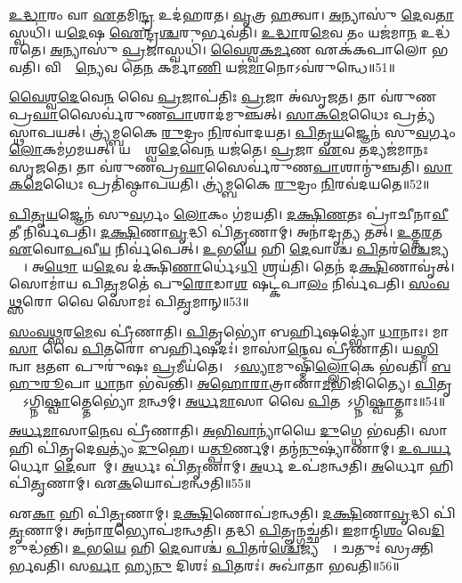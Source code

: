 \ul{𑌉}\ul{𑌦𑍍𑌧𑌾}𑌰𑌂 𑌵𑌾 \ul{𑌏}𑌤𑌮𑌿\ul{𑌨𑍍𑌦𑍍𑌰} 𑌉𑌦॑𑌹𑌰𑌤।
\ul{𑌵𑍃}𑌤𑍍𑌰 \ul{𑌹}𑌤𑍍𑌵𑌾।
\ul{𑌅}𑌨𑍍𑌯𑌾𑌸𑍁॑ \ul{𑌦𑍇}𑌵\ul{𑌤𑌾}𑌸𑍍𑌵𑌧𑌿॑।
𑌯\ul{𑌦𑍇}𑌷 \ul{𑌐}𑌨𑍍𑌦𑍍𑌰\ul{𑌶𑍍𑌚}𑌰𑍁𑌰𑍍𑌭𑌵॑𑌤𑌿।
\ul{𑌉}\ul{𑌦𑍍𑌧𑌾}𑌰\ul{𑌮𑍇}𑌵 𑌤𑌂 𑌯𑌜॑𑌮𑌾\ul{𑌨} 𑌉𑌦𑍍𑌧॑𑌰𑌤𑍇।
\ul{𑌅}𑌨𑍍𑌯𑌾𑌸𑍁॑ \ul{𑌪𑍍𑌰}𑌜𑌾𑌸𑍍𑌵𑌧𑌿॑।
\ul{𑌵𑍈}\ul{𑌶𑍍𑌵}\ul{𑌕}\ul{𑌰𑍍𑌮}𑌣 𑌏𑌕॑𑌕𑌪𑌾𑌲𑍋 𑌭𑌵𑌤𑌿।
𑌵𑌿𑌶𑍍𑌵𑌾᳚\ul{𑌨𑍍𑌯𑍇}𑌵 𑌤𑍇\ul{𑌨} 𑌕𑌰𑍍𑌮𑌾॑\ul{𑌣𑌿} 𑌯𑌜॑\ul{𑌮𑌾}𑌨𑍋\-𑌽𑌵॑𑌰𑍁𑌨𑍍𑌧𑍇॥51॥\anuvakamend[\ul{𑌋}\ul{𑌦𑍍𑌧𑍍𑌯}\ul{𑌤𑍇}\-𑌽𑌭𑍍𑌯॑𑌞𑍍𑌜𑌤𑍇 𑌜𑍁𑌹𑍋𑌤𑌿 𑌵𑍃𑌣𑌾𑌮𑌹𑍈 𑌭𑌵\ul{𑌤𑍍𑌯}𑌷𑍍𑌟𑍗 𑌚॑]

\ul{𑌵𑍈}\ul{𑌶𑍍𑌵}\ul{𑌦𑍇}𑌵𑍇\ul{𑌨} 𑌵𑍈 \ul{𑌪𑍍𑌰}𑌜𑌾𑌪॑𑌤𑌿𑌃 \ul{𑌪𑍍𑌰}𑌜𑌾 𑌅॑𑌸𑍃𑌜𑌤।
𑌤𑌾 𑌵॑𑌰𑍁𑌣\-𑌪𑍍𑌰\ul{𑌘𑌾}𑌸𑍈𑌰𑍍𑌵॑𑌰𑍁𑌣\-\ul{𑌪𑌾}𑌶𑌾𑌦॑𑌮𑍁𑌞𑍍𑌚𑌤𑍍।
\ul{𑌸𑌾}\ul{𑌕}\ul{𑌮𑍇}𑌧𑍈𑌃 𑌪𑍍𑌰𑌤𑍍𑌯॑𑌸𑍍𑌥𑌾𑌪𑌯𑌤𑍍।
𑌤𑍍𑌰𑍍𑌯॑𑌮𑍍𑌬𑌕𑍈 \ul{𑌰𑍁}𑌦𑍍𑌰𑌂 \ul{𑌨𑌿}𑌰𑌵𑌾॑𑌦𑌯𑌤।
\ul{𑌪𑌿}\ul{𑌤𑍃}\ul{𑌯}𑌜𑍍𑌞𑍇𑌨॑ 𑌸𑍁\ul{𑌵}𑌰𑍍𑌗𑌂 \ul{𑌲𑍋}𑌕𑌮॑𑌗𑌮𑌯𑌤𑍍।
𑌯𑌦𑍍𑌵𑍈᳚𑌶𑍍𑌵\ul{𑌦𑍇}𑌵𑍇\ul{𑌨} 𑌯𑌜॑𑌤𑍇।
\ul{𑌪𑍍𑌰}𑌜𑌾 \ul{𑌏}𑌵 𑌤𑌦𑍍𑌯𑌜॑𑌮𑌾𑌨𑌃 𑌸𑍃𑌜𑌤𑍇।
𑌤𑌾 𑌵॑𑌰𑍁𑌣𑌪𑍍𑌰\ul{𑌘𑌾}𑌸𑍈𑌰𑍍𑌵॑𑌰𑍁𑌣\ul{𑌪𑌾}𑌶𑌾𑌨𑍍𑌮𑍁॑𑌞𑍍𑌚𑌤𑌿।
\ul{𑌸𑌾}\ul{𑌕}\ul{𑌮𑍇}𑌧𑍈𑌃 𑌪𑍍𑌰𑌤𑌿॑\-𑌷𑍍𑌠𑌾𑌪𑌯𑌤𑌿।
𑌤𑍍𑌰𑍍𑌯॑𑌮𑍍𑌬𑌕𑍈 \ul{𑌰𑍁}𑌦𑍍𑌰𑌂 \ul{𑌨𑌿}𑌰𑌵॑𑌦𑌯𑌤𑍇॥52॥

\ul{𑌪𑌿}\ul{𑌤𑍃}\ul{𑌯}𑌜𑍍𑌞𑍇𑌨॑ 𑌸𑍁\ul{𑌵}𑌰𑍍𑌗𑌂 \ul{𑌲𑍋}𑌕𑌂 𑌗॑𑌮𑌯𑌤𑌿।
\ul{𑌦}\ul{𑌕𑍍𑌷𑌿}\ul{𑌣}𑌤𑌃 𑌪𑍍𑌰𑌾॑𑌚𑍀𑌨𑌾\ul{𑌵𑍀}𑌤𑍀 𑌨𑌿𑌰𑍍𑌵॑𑌪𑌤𑌿।
\ul{𑌦}\ul{𑌕𑍍𑌷𑌿}𑌣𑌾\ul{𑌵𑍃}𑌦𑍍𑌧𑌿 𑌪𑌿॑\ul{𑌤𑍃}𑌣𑌾𑌮𑍍।
𑌅𑌨𑌾॑𑌦𑍃\ul{𑌤𑍍𑌯} 𑌤𑌤𑍍।
\ul{𑌉}\ul{𑌤𑍍𑌤}\ul{𑌰}𑌤 \ul{𑌏}𑌵𑍋\ul{𑌪}𑌵𑍀\ul{𑌯} 𑌨𑌿𑌰𑍍𑌵॑𑌪𑍇𑌤𑍍।
\ul{𑌉}𑌭\ul{𑌯𑍇} 𑌹𑌿 \ul{𑌦𑍇}𑌵𑌾𑌶𑍍𑌚॑ \ul{𑌪𑌿}𑌤𑌰॑\ul{𑌶𑍍𑌚𑍇}𑌜𑍍𑌯𑌨𑍍𑌤𑍇᳚।
𑌅\ul{𑌥𑍋} 𑌯\ul{𑌦𑍇}𑌵 𑌦॑𑌕𑍍𑌷𑌿\ul{𑌣𑌾}𑌰𑍍𑌧𑍇॑𑌽\ul{𑌧𑌿} 𑌶𑍍𑌰𑌯॑𑌤𑌿।
𑌤𑍇𑌨॑ 𑌦\ul{𑌕𑍍𑌷𑌿}𑌣𑌾𑌵𑍃॑𑌤𑍍।
𑌸𑍋𑌮𑌾॑𑌯 𑌪𑌿\ul{𑌤𑍃}𑌮𑌤𑍇॑ 𑌪𑍁\ul{𑌰𑍋}𑌡𑌾\ul{𑌶}\ul{} 𑌷𑌟𑍍𑌕॑𑌪𑌾\ul{𑌲𑌂} 𑌨𑌿𑌰𑍍𑌵॑𑌪𑌤𑌿।
\ul{𑌸𑌂}\ul{𑌵}\ul{𑌥𑍍𑌸}𑌰𑍋 𑌵𑍈 𑌸𑍋𑌮𑌃॑ 𑌪𑌿\ul{𑌤𑍃}𑌮𑌾𑌨𑍍॥53॥

\ul{𑌸𑌂}\ul{𑌵}\ul{𑌥𑍍𑌸}𑌰\ul{𑌮𑍇}𑌵 𑌪𑍍𑌰𑍀॑𑌣𑌾𑌤𑌿।
\ul{𑌪𑌿}𑌤𑍃𑌭𑍍𑌯𑍋॑ 𑌬𑌰𑍍\mbox{}\ul{𑌹𑌿}𑌷𑌦𑍍𑌭𑍍𑌯𑍋॑ \ul{𑌧𑌾}𑌨𑌾𑌃।
𑌮𑌾\ul{𑌸𑌾} 𑌵𑍈 \ul{𑌪𑌿}𑌤𑌰𑍋॑ 𑌬𑌰𑍍\mbox{}\ul{𑌹𑌿}𑌷𑌦𑌃॑।
𑌮𑌾𑌸𑌾॑\ul{𑌨𑍇}𑌵 𑌪𑍍𑌰𑍀॑𑌣𑌾𑌤𑌿।
𑌯\ul{𑌸𑍍𑌮𑌿}𑌨𑍍𑌵𑌾 \ul{𑌋}𑌤𑍗 𑌪𑍁𑌰𑍁॑𑌷𑌃 \ul{𑌪𑍍𑌰}𑌮𑍀𑌯॑𑌤𑍇।
𑌸𑍋᳚𑌽\ul{𑌸𑍍𑌯𑌾}𑌮𑍁𑌷𑍍𑌮𑌿𑌁॑\ul{𑌲𑍍𑌲𑍋}𑌕𑍇 𑌭॑𑌵𑌤𑌿।
\ul{𑌬}\ul{𑌹𑍁}\ul{𑌰𑍂}𑌪𑌾 \ul{𑌧𑌾}𑌨𑌾 𑌭॑𑌵𑌨𑍍𑌤𑌿।
\ul{𑌅}\ul{𑌹𑍋}\ul{𑌰𑌾}𑌤𑍍𑌰𑌾𑌣𑌾॑\ul{𑌮}𑌭𑌿𑌜𑌿॑𑌤𑍍𑌯𑍈।
\ul{𑌪𑌿}𑌤𑍃𑌭𑍍𑌯𑍋᳚\-𑌽𑌗𑍍𑌨𑌿\ul{𑌷𑍍𑌵𑌾}𑌤𑍍𑌤𑍇𑌭𑍍𑌯𑍋॑ \ul{𑌮}𑌨𑍍𑌥𑌮𑍍।
\ul{𑌅}\ul{𑌰𑍍𑌧}\ul{𑌮𑌾}𑌸𑌾 𑌵𑍈 \ul{𑌪𑌿}𑌤𑌰𑍋᳚\-𑌽𑌗𑍍𑌨𑌿\ul{𑌷𑍍𑌵𑌾}𑌤𑍍𑌤𑌾𑌃॥54॥

\ul{𑌅}\ul{𑌰𑍍𑌧}\ul{𑌮𑌾}𑌸𑌾\ul{𑌨𑍇}𑌵 𑌪𑍍𑌰𑍀॑𑌣𑌾𑌤𑌿।
\ul{𑌅}\ul{𑌭𑌿}\ul{𑌵𑌾}𑌨𑍍𑌯𑌾॑𑌯𑍈 \ul{𑌦𑍁}𑌗𑍍𑌧𑍇 𑌭॑𑌵𑌤𑌿।
𑌸𑌾 𑌹𑌿 𑌪𑌿॑𑌤𑍃𑌦𑍇\ul{𑌵}𑌤𑍍𑌯𑌂॑ \ul{𑌦𑍁}𑌹𑍇।
𑌯\ul{𑌤𑍍𑌪𑍂}𑌰𑍍𑌣𑌮𑍍।
𑌤𑌨𑍍𑌮॑\ul{𑌨𑍁}𑌷𑍍𑌯𑌾॑𑌣𑌾𑌮𑍍।
\ul{𑌉}\ul{𑌪}\ul{𑌰𑍍𑌯}𑌰𑍍𑌧𑍋 \ul{𑌦𑍇}𑌵𑌾𑌨𑌾᳚𑌮𑍍।
\ul{𑌅}𑌰𑍍𑌧𑌃 𑌪𑌿॑\ul{𑌤𑍃}𑌣𑌾𑌮𑍍।
\ul{𑌅}𑌰𑍍𑌧 𑌉𑌪॑𑌮𑌨𑍍𑌥𑌤𑌿।
\ul{𑌅}𑌰𑍍𑌧𑍋 𑌹𑌿 𑌪𑌿॑\ul{𑌤𑍃}𑌣𑌾𑌮𑍍।
𑌏\ul{𑌕}𑌯𑍋𑌪॑𑌮𑌨𑍍𑌥𑌤𑌿॥55॥

𑌏\ul{𑌕𑌾} 𑌹𑌿 𑌪𑌿॑\ul{𑌤𑍃}𑌣𑌾𑌮𑍍।
\ul{𑌦}\ul{𑌕𑍍𑌷𑌿}𑌣𑍋𑌪॑𑌮𑌨𑍍𑌥𑌤𑌿।
\ul{𑌦}\ul{𑌕𑍍𑌷𑌿}𑌣𑌾\ul{𑌵𑍃}𑌦𑍍𑌧𑌿 𑌪𑌿॑\ul{𑌤𑍃}𑌣𑌾𑌮𑍍।
𑌅𑌨𑌾॑\ul{𑌰}𑌭𑍍𑌯𑍋𑌪॑𑌮𑌨𑍍𑌥𑌤𑌿।
𑌤𑌦𑍍𑌧𑌿 \ul{𑌪𑌿}𑌤𑍄𑌨𑍍𑌗𑌚𑍍𑌛॑𑌤𑌿।
\ul{𑌇}𑌮𑌾𑌨𑍍𑌦𑌿\ul{𑌶𑌂} 𑌵𑍇\ul{𑌦𑌿}𑌮𑍁𑌦𑍍𑌧॑𑌨𑍍𑌤𑌿।
\ul{𑌉}𑌭\ul{𑌯𑍇} 𑌹𑌿 \ul{𑌦𑍇}𑌵𑌾𑌶𑍍𑌚॑ \ul{𑌪𑌿}𑌤𑌰॑\ul{𑌶𑍍𑌚𑍇}𑌜𑍍𑌯𑌨𑍍𑌤𑍇᳚।
𑌚𑌤𑍁𑌃॑ 𑌸𑍍𑌰𑌕𑍍𑌤𑌿𑌰𑍍𑌭𑌵𑌤𑌿।
𑌸\ul{𑌰𑍍𑌵𑌾} 𑌹𑍍𑌯\ul{𑌨𑍁} 𑌦𑌿𑌶𑌃॑ \ul{𑌪𑌿}𑌤𑌰𑌃॑।
𑌅𑌖𑌾॑𑌤𑌾 𑌭𑌵𑌤𑌿॥56॥

